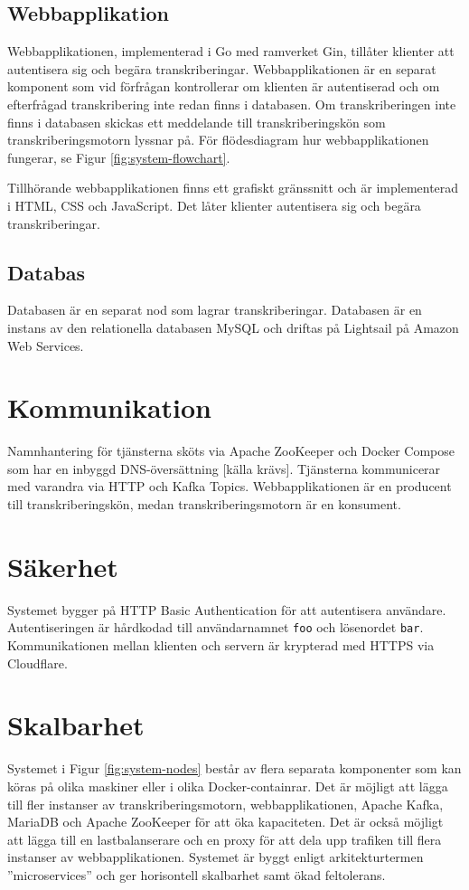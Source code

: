 \subsection{Webbapplikation}
Webbapplikationen, implementerad i Go med ramverket Gin, tillåter klienter att
autentisera sig och begära transkriberingar. Webbapplikationen är en separat
komponent som vid förfrågan kontrollerar om klienten är autentiserad och om
efterfrågad transkribering inte redan finns i databasen. Om transkriberingen
inte finns i databasen skickas ett meddelande till transkriberingskön som
transkriberingsmotorn lyssnar på. För flödesdiagram hur webbapplikationen
fungerar, se Figur \ref{fig:system-flowchart}.

Tillhörande webbapplikationen finns ett grafiskt gränssnitt och är
implementerad i HTML, CSS och JavaScript. Det låter klienter autentisera sig
och begära transkriberingar. 

\subsection{Databas}
Databasen är en separat nod som lagrar transkriberingar. Databasen är en
instans av den relationella databasen MySQL och driftas på Lightsail på Amazon
Web Services.

\section{Kommunikation}
Namnhantering för tjänsterna sköts via Apache ZooKeeper och Docker Compose
som har en inbyggd DNS-översättning [källa krävs]. Tjänsterna kommunicerar med
varandra via HTTP och Kafka Topics. Webbapplikationen är en producent till
transkriberingskön, medan transkriberingsmotorn är en konsument. 

\section{Säkerhet}
Systemet bygger på HTTP Basic Authentication för att autentisera användare.
Autentiseringen är hårdkodad till användarnamnet \verb|foo| och lösenordet
\verb|bar|. Kommunikationen mellan klienten och servern är krypterad med
HTTPS via Cloudflare.

\section{Skalbarhet}
Systemet i Figur \ref{fig:system-nodes} består av flera separata komponenter
som kan köras på olika maskiner eller i olika Docker-containrar. Det är möjligt
att lägga till fler instanser av transkriberingsmotorn, webbapplikationen,
Apache Kafka, MariaDB och Apache ZooKeeper för att öka kapaciteten. Det är
också möjligt att lägga till en lastbalanserare och en proxy för att dela upp
trafiken till flera instanser av webbapplikationen. Systemet är byggt enligt
arkitekturtermen ''microservices'' och ger horisontell skalbarhet samt ökad
feltolerans.
